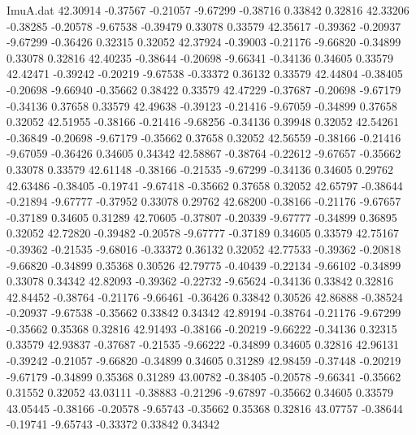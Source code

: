\begin{filecontents}{ImuA.dat}
  42.30914   -0.37567   -0.21057   -9.67299   -0.38716    0.33842    0.32816
  42.33206   -0.38285   -0.20578   -9.67538   -0.39479    0.33078    0.33579
  42.35617   -0.39362   -0.20937   -9.67299   -0.36426    0.32315    0.32052
  42.37924   -0.39003   -0.21176   -9.66820   -0.34899    0.33078    0.32816
  42.40235   -0.38644   -0.20698   -9.66341   -0.34136    0.34605    0.33579
  42.42471   -0.39242   -0.20219   -9.67538   -0.33372    0.36132    0.33579
  42.44804   -0.38405   -0.20698   -9.66940   -0.35662    0.38422    0.33579
  42.47229   -0.37687   -0.20698   -9.67179   -0.34136    0.37658    0.33579
  42.49638   -0.39123   -0.21416   -9.67059   -0.34899    0.37658    0.32052
  42.51955   -0.38166   -0.21416   -9.68256   -0.34136    0.39948    0.32052
  42.54261   -0.36849   -0.20698   -9.67179   -0.35662    0.37658    0.32052
  42.56559   -0.38166   -0.21416   -9.67059   -0.36426    0.34605    0.34342
  42.58867   -0.38764   -0.22612   -9.67657   -0.35662    0.33078    0.33579
  42.61148   -0.38166   -0.21535   -9.67299   -0.34136    0.34605    0.29762
  42.63486   -0.38405   -0.19741   -9.67418   -0.35662    0.37658    0.32052
  42.65797   -0.38644   -0.21894   -9.67777   -0.37952    0.33078    0.29762
  42.68200   -0.38166   -0.21176   -9.67657   -0.37189    0.34605    0.31289
  42.70605   -0.37807   -0.20339   -9.67777   -0.34899    0.36895    0.32052
  42.72820   -0.39482   -0.20578   -9.67777   -0.37189    0.34605    0.33579
  42.75167   -0.39362   -0.21535   -9.68016   -0.33372    0.36132    0.32052
  42.77533   -0.39362   -0.20818   -9.66820   -0.34899    0.35368    0.30526
  42.79775   -0.40439   -0.22134   -9.66102   -0.34899    0.33078    0.34342
  42.82093   -0.39362   -0.22732   -9.65624   -0.34136    0.33842    0.32816
  42.84452   -0.38764   -0.21176   -9.66461   -0.36426    0.33842    0.30526
  42.86888   -0.38524   -0.20937   -9.67538   -0.35662    0.33842    0.34342
  42.89194   -0.38764   -0.21176   -9.67299   -0.35662    0.35368    0.32816
  42.91493   -0.38166   -0.20219   -9.66222   -0.34136    0.32315    0.33579
  42.93837   -0.37687   -0.21535   -9.66222   -0.34899    0.34605    0.32816
  42.96131   -0.39242   -0.21057   -9.66820   -0.34899    0.34605    0.31289
  42.98459   -0.37448   -0.20219   -9.67179   -0.34899    0.35368    0.31289
  43.00782   -0.38405   -0.20578   -9.66341   -0.35662    0.31552    0.32052
  43.03111   -0.38883   -0.21296   -9.67897   -0.35662    0.34605    0.33579
  43.05445   -0.38166   -0.20578   -9.65743   -0.35662    0.35368    0.32816
  43.07757   -0.38644   -0.19741   -9.65743   -0.33372    0.33842    0.34342

\end{filecontents}
